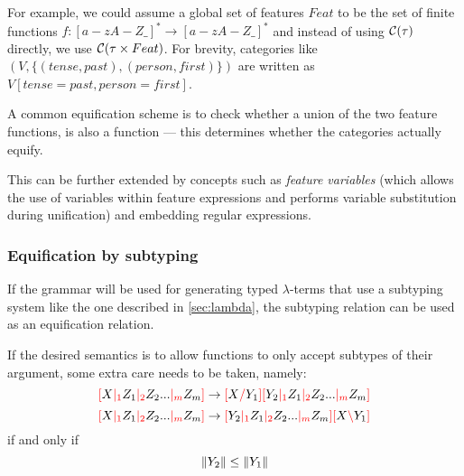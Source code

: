 \documentclass[main.tex]{subfiles}
\begin{document}
For example, we could assume a global set of features $Feat$ to be the
set of finite functions $f: [a-zA-Z\_]^* \rightarrow [a-zA-Z\_]^*$
and instead of using $\mathcal{C}( \tau )$ directly, we use $\mathcal{C}( \tau \times Feat )$.
For brevity, categories like $(V, \{ (tense, past), (person, first) \})$
are written as $V[tense=past, person=first]$.

A common equification scheme is to check whether a union of the two feature functions,
is also a function --- this determines whether the categories actually equify.

This can be further extended by concepts such as \emph{feature variables}
(which allows the use of variables within feature expressions and
performs variable substitution during unification) and embedding regular expressions.

\subsubsection{Equification by subtyping}\label{hack:subtyping}
If the grammar will be used for generating typed $\lambda$-terms that use
a subtyping system like the one described in \cref{sec:lambda}, the subtyping
relation can be used as an equification relation.

If the desired semantics is to allow functions to only accept subtypes of
their argument, some extra care needs to be taken, namely:
\[ \textcolor{red}{[} X \textcolor{red}{|_{1}} Z_1 \textcolor{red}{|_{2}} Z_2 ... \textcolor{red}{|_{m}} Z_m \textcolor{red}{]} \rightarrow \textcolor{red}{[} X \textcolor{red}{/} Y_1 \textcolor{red}{]} \textcolor{red}{[} Y_2 \textcolor{red}{|_{1}} Z_1 \textcolor{red}{|_{2}} Z_2 ... \textcolor{red}{|_{m}} Z_m \textcolor{red}{]} \]
\[ \textcolor{red}{[} X \textcolor{red}{|_{1}} Z_1 \textcolor{red}{|_{2}} Z_2 ... \textcolor{red}{|_{m}} Z_m \textcolor{red}{]} \rightarrow \textcolor{red}{[} Y_2 \textcolor{red}{|_{1}} Z_1 \textcolor{red}{|_{2}} Z_2 ... \textcolor{red}{|_{m}} Z_m \textcolor{red}{]} \textcolor{red}{[} X \textcolor{red}{\backslash} Y_1 \textcolor{red}{]} \]
if and only if
\begin{equation}\label{eq:typeless}
    \|Y_2\| \leq \|Y_1\|
\end{equation}
\end{document}
